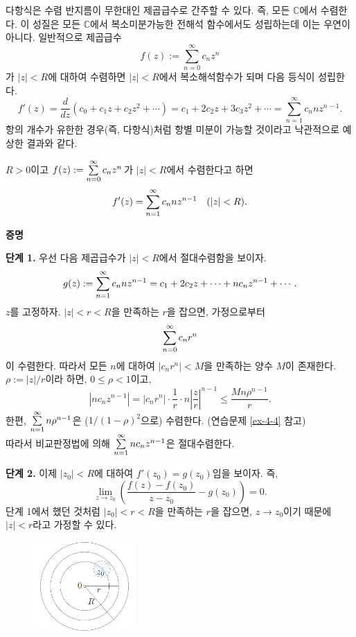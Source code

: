다항식은 수렴 반지름이 무한대인 제곱급수로 간주할 수 있다.
즉, 모든 $\mathbb C$에서 수렴한다.
이 성질은 모든 $\mathbb C$에서 복소미분가능한 전해석 함수에서도 성립하는데
이는 우연이 아니다.
일반적으로 제곱급수 
\[
f(z):= \sum_{n=0}^\infty c_nz^n
\]
가 $|z|<R$에 대하여 수렴하면
$|z|<R$에서 복소해석함수가 되며 
다음 등식이 성립한다.
\[
f'(z) = \dfrac d{dz} (c_0+ c_1z + c_2z^2 + \cdots)
= c_1 + 2c_2z + 3c_3z^2 + \cdots 
= \sum_{n=1}^\infty c_n n z^{n-1}.
\]
항의 개수가 유한한 경우(즉, 다항식)처럼 
항별 미분이 가능할 것이라고 낙관적으로 예상한 결과와 같다.

\begin{salttheorem}{}{} \label{thm-4-3}
$R>0$이고 $f(z):= \sum\limits_{n=0}^\infty c_nz^n$\,가
$|z|<R$에서 수렴한다고 하면 \\[1ex]
\[
f'(z) = \sum\limits_{n=1}^\infty c_n n z^{n-1} 
\quad (|z|<R).
\]
\end{salttheorem}

\newpage %

{\bf 증명}

{\bf 단계 1.}
우선 다음 제곱급수가 $|z|<R$에서 절대수렴함을 보이자.
\[
g(z):= \sum\limits_{n=1}^\infty c_n n z^{n-1}
=  c_1 + 2c_2z +  \cdots + nc_nz^{n-1} + \cdots.
\]
$z$를 고정하자.
$|z|<r<R$을 만족하는 $r$을 잡으면, 가정으로부터
\[
\sum\limits_{n=0}^\infty c_nr^n
\]
이 수렴한다. 따라서 모든 $n$에 대하여
$|c_nr^n|<M$을 만족하는 양수 $M$이 존재한다.
$\rho:=|z|/r$이라 하면, $0\le \rho <1$이고,
\[
|nc_nz^{n-1}| = |c_nr^n| \cdot 
\dfrac1r \cdot n \left| \dfrac zr\right|^{n-1}
\le \dfrac{Mn\rho^{n-1}}r.
\]
한편, $\sum\limits_{n=1}^\infty n\rho^{n-1}$은 
($1/(1-\rho)^2$으로) 수렴한다. (연습문제 \ref{ex-4-4} 참고) \\
따라서 비교판정법에 의해
$\sum\limits_{n=1}^\infty nc_nz^{n-1}$은 절대수렴한다.

{\bf 단계 2.}
이제 $|z_0|<R$에 대하여 $f'(z_0) = g(z_0)$임을 보이자. 즉,
\[
\lim_{z\to z_0} \left(
\dfrac{f(z)-f(z_0)}{z-z_0} - g(z_0) \right) = 0.
\]
단계 1에서 했던 것처럼 $|z_0|<r<R$을 만족하는 $r$을 잡으면, 
$z\to z_0$이기 때문에 $|z|<r$라고 가정할 수 있다.

\begin{figure}[h!]
\begin{center}
\includegraphics[width=0.35\textwidth]{./SaltChapter/figs/fig-4-0-3}
\end{center}
\end{figure}

